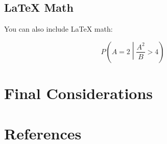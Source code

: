 \documentclass[
  a4paper,
]{article}
\begin{document}
\subsection{LaTeX Math}\label{latex-math}

You can also include LaTeX math:

\[
P\left(A=2\middle|\frac{A^2}{B}>4\right)
\]


\section{Final Considerations}\label{final-considerations}


\section*{References}\label{references}

\end{document}
